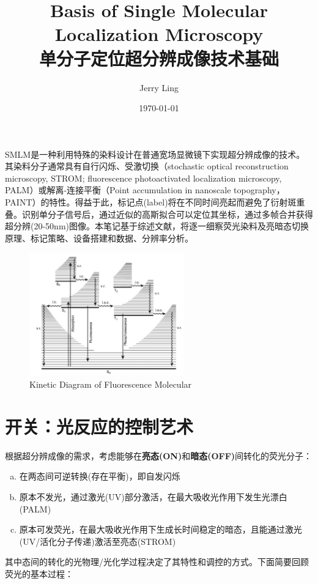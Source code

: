 \documentclass[12pt]{ctexart}%
\title{Basis of Single Molecular Localization Microscopy\\单分子定位超分辨成像技术基础}
\author{Jerry Ling}
\date{\today}
\begin{document}
\maketitle  %
SMLM是一种利用特殊的染料设计在普通宽场显微镜下实现超分辨成像的技术。其染料分子通常具有自行闪烁、受激切换（stochastic optical reconstruction microscopy, STROM; fluorescence photoactivated localization microscopy, PALM）或解离-连接平衡（Point accumulation in nanoscale topography， PAINT）的特性。得益于此，标记点(label)将在不同时间亮起而避免了衍射斑重叠。识别单分子信号后，通过近似的高斯拟合可以定位其坐标，通过多帧合并获得超分辨(20-50nm)图像。本笔记基于综述文献，将逐一细察荧光染料及亮暗态切换原理、标记策略、设备搭建和数据、分辨率分析。\begin{figure}[t] %
    \centering
    \includegraphics[width=0.6\textwidth]{Kinetic_diagram}
    \caption{Kinetic Diagram of Fluorescence Molecular}
    \label{Kinetic}
\end{figure}
\section*{开关：光反应的控制艺术}
根据超分辨成像的需求，考虑能够在\textbf{亮态(ON)}和\textbf{暗态(OFF)}间转化的荧光分子：
\begin{framed}
    \begin{enumerate}[a)]
        \item 在两态间可逆转换(存在平衡)，即自发闪烁
        \item 原本不发光，通过激光(UV)部分激活，在最大吸收光作用下发生光漂白(PALM)
        \item 原本可发荧光，在最大吸收光作用下生成长时间稳定的暗态，且能通过激光(UV/活化分子传递)激活至亮态(STROM)
    \end{enumerate}
\end{framed}
\noindent 其中态间的转化的光物理/光化学过程决定了其特性和调控的方式。下面简要回顾荧光的基本过程：
\end{document}

